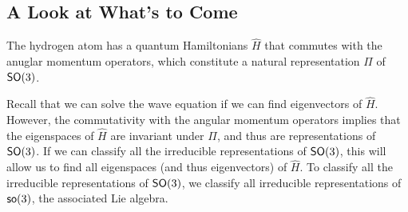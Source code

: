\subsection{A Look at What's to Come}
The hydrogen atom has a quantum Hamiltonians $\hat{H}$ that commutes with the anuglar momentum operators, which constitute a natural representation $\Pi$ of $\operatorname{\textsf{SO}}(3)$.

Recall that we can solve the wave equation if we can find eigenvectors of $\hat{H}$. However, the commutativity with the angular momentum operators implies that the eigenspaces of $\hat{H}$ are invariant under $\Pi$, and thus are representations of $\operatorname{\textsf{SO}}(3)$. If we can classify all the irreducible representations of $\operatorname{\textsf{SO}}(3)$, this will allow us to find all eigenspaces (and thus eigenvectors) of $\hat{H}$. To classify all the irreducible representations of $\operatorname{\textsf{SO}}(3)$, we classify all irreducible representations of $\operatorname{\textsf{so}}(3)$, the associated Lie algebra.
